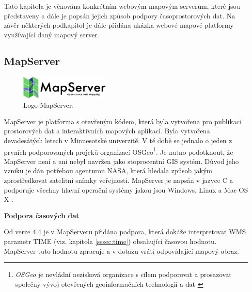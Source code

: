 Tato kapitola je věnována konkrétním webovým mapovým serverům, které jsou
představeny a dále je popsán jejich způsob podpory časoprostorových dat. Na závěr některých podkapitol je dále přidána ukázka webové mapové platformy využívající daný mapový server.

\subsection{MapServer}
\label{sssec:mapserver}

\begin{figure}[h!]
	\centering
	\includegraphics[width=0.4\textwidth]{../img/mapserver-logo.png}
    \caption{Logo MapServer: \cite{mapserver_about}}
	\label{fig:mapserver-logo}
\end{figure}
\bigskip

MapServer je platforma s otevřeným kódem, která byla vytvořena pro
publikaci prostorových dat a interaktivních mapových aplikací. Byla
vytvořena devadesátých letech v Minnesotské univerzitě. V té době se
jednalo o jeden z prvních podporovaných projeků organizací OSGeo\footnote{\textit{OSGeo} je nevládní nezisková organizace s cílem  podporovat a prosazovat společný vývoj otevřených geoinformačních technologií a dat \cite{osgeo}}. Je
nutno podotknout, že MapServer není a ani nebyl navržen jako
stoprocentní GIS systém. Důvod jeho vzniku je dán potřebou agenturou
NASA, která hledala způsob jakým zprostředkovat satelitní snímky
veřejnosti. MapServer je napsán v jazyce C a podporuje všechny hlavní
operační systémy jakou jsou Windows, Linux a Mac OS X
\cite{mapserver_about}.

\bigskip
\noindent
\textbf{Podpora časových dat}

Od verze 4.4 je v MapServeru přidána podpora, která dokáže
interpretovat WMS parametr TIME (viz. kapitola \ref{sssec:time}) obsahující časovou hodnotu. MapServer
tuto hodnotu zpracuje a v dotazu vrátí odpovídající mapový obraz.


